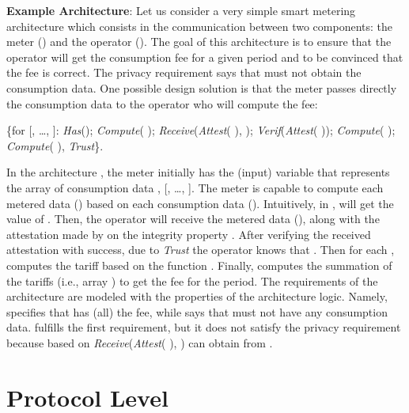 \documentclass{llncs}
\begin{document}
\textbf{Example Architecture}: Let us consider a very simple smart 
metering architecture which consists in the communication between two components: the meter () 
and the operator (). The goal of this architecture is to ensure that the operator will get the consumption 
fee for a given period and to be convinced that the fee is correct. The privacy requirement 
says that  must not obtain the consumption data. One possible design solution is that the meter passes directly the consumption data to the operator who will compute the fee:  

\small
\begin{center}
  \{for   [, \dots, ]: \textit{Has}(); \textit{Compute}(  ); 
\textit{Receive}(\textit{Attest}(  ), ); 
\textit{Verif}(\textit{Attest}(  )); 
\textit{Compute}(  ); \textit{Compute}(  
), \textit{Trust}\}. 
\end{center}
\normalsize

In the architecture , the meter initially has the (input) variable  that 
represents the array of  consumption data ,   [, \dots, ]. 
The meter is capable to compute each metered data () based on each consumption data (). Intuitively, 
in   ,   will get the value 
of  . Then, the operator will receive the metered data (), 
along with the attestation made by  on the integrity property   
. After verifying the received attestation with success, due to \textit{Trust} 
the operator knows that    . Then for each 
,  computes the tariff based on the function . Finally,  computes 
the summation of the  tariffs (i.e., array ) to get the fee for the period. 
The requirements of the architecture are modeled with the properties of the architecture logic. Namely, 
 specifies that  has (all) the fee, while 
 says that  must not have any consumption data. 
 fulfills the first requirement, but it does not satisfy the privacy requirement because  
based on \textit{Receive}(\textit{Attest}(   ), 
)  can obtain  from . 

\section{Protocol Level} 
\label{sec:calc}
\end{document}
